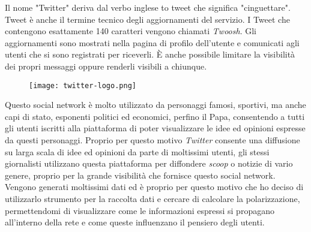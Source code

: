 Il nome "Twitter" deriva dal verbo inglese to tweet che significa "cinguettare". Tweet è anche il termine tecnico degli aggiornamenti del servizio. I Tweet che contengono esattamente 140 caratteri vengono chiamati \textit{Twoosh}. Gli aggiornamenti sono mostrati nella pagina di profilo dell'utente e comunicati agli utenti che si sono registrati per riceverli. È anche possibile limitare la visibilità dei propri messaggi oppure renderli visibili a chiunque. \begin{figure}[h!]
    \begin{center}
      \texttt{[image: twitter-logo.png]}
    \end{center}
  \end{figure}

Questo social network è molto utilizzato da personaggi famosi, sportivi, ma anche capi di stato, esponenti politici ed economici, perfino il Papa, consentendo a tutti gli utenti iscritti alla piattaforma di poter visualizzare le idee ed opinioni espresse da questi personaggi. Proprio per questo motivo \textit{Twitter} consente una diffusione su larga scala di idee ed opinioni da parte di moltissimi utenti, gli stessi giornalisti utilizzano questa piattaforma per diffondere \textit{scoop} o notizie di vario genere, proprio per la grande visibilità che fornisce questo social network.
Vengono generati moltissimi dati ed è proprio per questo motivo che ho deciso di utilizzarlo strumento per la raccolta dati e cercare di calcolare la polarizzazione, permettendomi di visualizzare come le informazioni espressi si propagano all'interno della rete e come queste influenzano il pensiero degli utenti.


